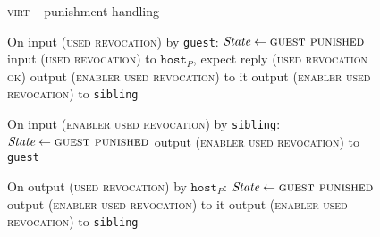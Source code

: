 \begin{figure}[H]
  \begin{processbox}{\textsc{virt} -- punishment handling}
    \begin{algorithmic}[1]
      \State On input (\textsc{used revocation}) by \texttt{guest}:
      \label{code:virtual-layer:punishment:when-punished-1}
      \Indent
        \State $\textit{State} \gets \textsc{guest punished}$
        \State input (\textsc{used revocation}) to $\texttt{host}_P$, expect
        reply (\textsc{used revocation ok})
          \State output (\textsc{enabler used revocation}) to it
        \Else \: 
          \State output (\textsc{enabler used revocation}) to \texttt{sibling}
        \EndIf
      \EndIndent
      \Statex

      \State On input (\textsc{enabler used revocation}) by \texttt{sibling}:
      \Indent
        \State $\textit{State} \gets \textsc{guest punished}$
        \State output (\textsc{enabler used revocation}) to \texttt{guest}
      \EndIndent
      \Statex

      \State On output (\textsc{used revocation}) by $\texttt{host}_P$:
      \label{code:virtual-layer:punishment:when-punished-2}
      \Indent
        \State $\itistate \gets \textsc{guest punished}$
          \State output (\textsc{enabler used revocation}) to it
        \Else \: 
          \State output (\textsc{enabler used revocation}) to \texttt{sibling}
        \EndIf
      \EndIndent
    \end{algorithmic}
  \end{processbox}
  \caption{}
  \label{code:virtual-layer:punishment}
\end{figure}
